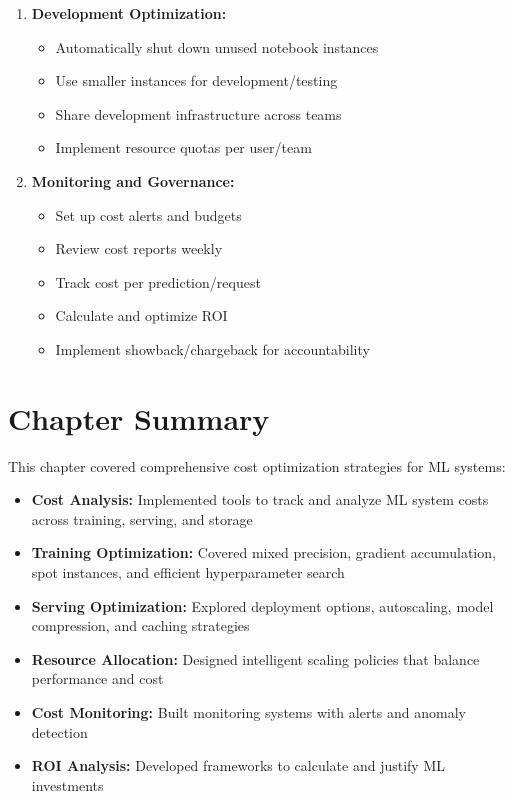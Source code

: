 \begin{enumerate}
    \item \textbf{Development Optimization:}
    \begin{itemize}
        \item Automatically shut down unused notebook instances
        \item Use smaller instances for development/testing
        \item Share development infrastructure across teams
        \item Implement resource quotas per user/team
    \end{itemize}

    \item \textbf{Monitoring and Governance:}
    \begin{itemize}
        \item Set up cost alerts and budgets
        \item Review cost reports weekly
        \item Track cost per prediction/request
        \item Calculate and optimize ROI
        \item Implement showback/chargeback for accountability
    \end{itemize}
\end{enumerate}

\section{Chapter Summary}

This chapter covered comprehensive cost optimization strategies for ML systems:

\begin{itemize}
    \item \textbf{Cost Analysis:} Implemented tools to track and analyze ML system costs across training, serving, and storage

    \item \textbf{Training Optimization:} Covered mixed precision, gradient accumulation, spot instances, and efficient hyperparameter search

    \item \textbf{Serving Optimization:} Explored deployment options, autoscaling, model compression, and caching strategies

    \item \textbf{Resource Allocation:} Designed intelligent scaling policies that balance performance and cost

    \item \textbf{Cost Monitoring:} Built monitoring systems with alerts and anomaly detection

    \item \textbf{ROI Analysis:} Developed frameworks to calculate and justify ML investments
\end{itemize}

